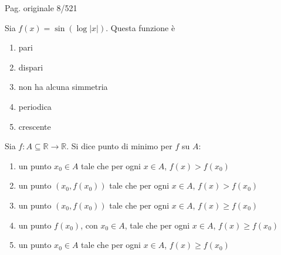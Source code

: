 \par\noindent\hfill{\color{cyan!65!black}\scriptsize Pag. originale 8/521}\par\smallskip
\begin{quiz}
Sia $f(x)=\sin(\log|x|)$. Questa funzione \`e
\begin{enumerate}[label=\alph*),leftmargin=1.3cm,itemsep=3pt,topsep=5pt]\item pari\item dispari\item non ha alcuna simmetria\item periodica\item crescente\end{enumerate}
\end{quiz}

\begin{quiz}
Sia $f:A\subseteq\mathbb R\to\mathbb R$. Si dice punto di minimo per $f$ su $A$:
\begin{enumerate}[label=\alph*),leftmargin=1.3cm,itemsep=3pt,topsep=5pt]\item un punto $x_0\in A$ tale che per ogni $x\in A$, $f(x)>f(x_0)$\item un punto $(x_0,f(x_0))$ tale che per ogni $x\in A$, $f(x)>f(x_0)$\item un punto $(x_0,f(x_0))$ tale che per ogni $x\in A$, $f(x)\ge f(x_0)$\item un punto $f(x_0)$, con $x_0\in A$, tale che per ogni $x\in A$, $f(x)\ge f(x_0)$\item un punto $x_0\in A$ tale che per ogni $x\in A$, $f(x)\ge f(x_0)$\end{enumerate}
\end{quiz}

